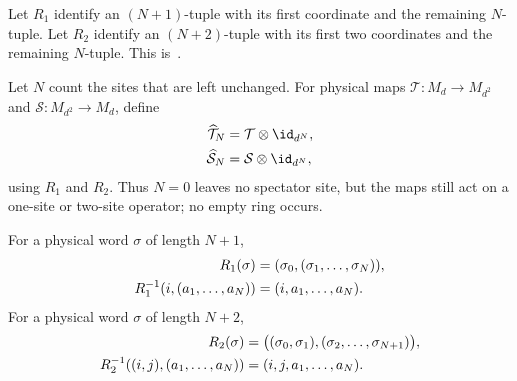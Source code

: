 \begin{definition}
    \label{def:finite_tuple_regroupings}
    \leanok
    Let $R_1$ identify an $(N+1)$-tuple with its first coordinate and the
    remaining $N$-tuple. Let $R_2$ identify an $(N+2)$-tuple with its first
    two coordinates and the remaining $N$-tuple.
    This is~\cite[``Initial-coordinate regroupings'']{QICLean2026Blueprint}.
\end{definition}

\begin{definition}
    \label{def:mpdo_global_renormalization_maps}
    \leanok
    Let $N$ count the sites that are left unchanged. For physical maps
    $\mathcal T:M_d\to M_{d^2}$ and $\mathcal S:M_{d^2}\to M_d$, define
    \begin{align}
        \widehat{\mathcal T}_N
         & =\mathcal T\otimes\id_{d^N},
        \notag                          \\
        \widehat{\mathcal S}_N
         & =\mathcal S\otimes\id_{d^N},
        \notag
    \end{align}
    using $R_1$ and $R_2$. Thus $N=0$ leaves no spectator site, but the
    maps still act on a one-site or two-site operator; no empty ring occurs.
\end{definition}

\begin{lemma}
    \label{lem:mpdo_global_renormalization_regrouping}
    \leanok
    For a physical word $\sigma$ of length $N+1$,
    \begin{align}
        R_1(\sigma)
         & =(\sigma_0,(\sigma_1,\ldots,\sigma_N)),
        \notag                                     \\
        R_1^{-1}(i,(a_1,\ldots,a_N))
         & =(i,a_1,\ldots,a_N).
        \notag
    \end{align}
    For a physical word $\sigma$ of length $N+2$,
    \begin{align}
        R_2(\sigma)
         & =\bigl((\sigma_0,\sigma_1),
        (\sigma_2,\ldots,\sigma_{N+1})\bigr),
        \notag                         \\
        R_2^{-1}((i,j),(a_1,\ldots,a_N))
         & =(i,j,a_1,\ldots,a_N).
        \notag
    \end{align}
\end{lemma}

